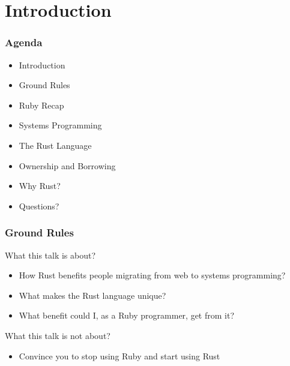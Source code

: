 \section{Introduction}
\label{sec:introduction}

\begin{frame}
  \frametitle{Agenda}
  \begin{itemize}
  \item Introduction
  \item Ground Rules
  \item Ruby Recap
  \item Systems Programming
  \item The Rust Language
  \item Ownership and Borrowing
  \item Why Rust?
  \item Questions?
  \end{itemize}
\end{frame}

\begin{frame}
  \frametitle{Ground Rules}
  What this talk is about?
  \begin{itemize}
  \item How Rust benefits people migrating from web to systems programming?
  \item What makes the Rust language unique?
  \item What benefit could I, as a Ruby programmer, get from it?
  \end{itemize}
  What this talk is not about?
  \begin{itemize}
  \item Convince you to stop using Ruby and start using Rust
  \end{itemize}
\end{frame}
